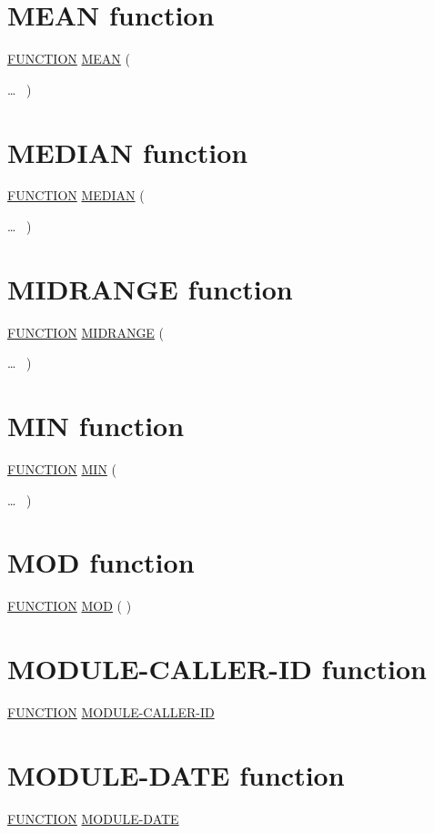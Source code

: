 \documentclass[a4paper,oneside,svgnames]{scrbook}
\makeatletter
\newcommand{\key}[1]{\underline{#1}}
\newcommand{\gnucobol}[1]{%
  \colorbox{orange!75}{#1}}
\newenvironment{1=}{$\left\{ \begin{tabular}{@{}l@{}}}{\end{tabular} \right\}$}
\makeatother
\begin{document}
\section{MEAN function}

\key{FUNCTION} \key{MEAN} (
\begin{1=}
  \argument
\end{1=}\ldots
\ {})

\section{MEDIAN function}

\key{FUNCTION} \key{MEDIAN} (
\begin{1=}
  \argument
\end{1=}\ldots
\ {})

\section{MIDRANGE function}

\key{FUNCTION} \key{MIDRANGE} (
\begin{1=}
  \argument
\end{1=}\ldots
\ {})

\section{MIN function}

\key{FUNCTION} \key{MIN} (
\begin{1=}
  \argument
\end{1=}\ldots
\ {})

\section{MOD function}

\key{FUNCTION} \key{MOD} ( \argument \argument )

\section{MODULE-CALLER-ID function}

\gnucobol{
  \key{FUNCTION} \key{MODULE-CALLER-ID}
}

\section{MODULE-DATE function}

\gnucobol{
  \key{FUNCTION} \key{MODULE-DATE}
}
\end{document}
